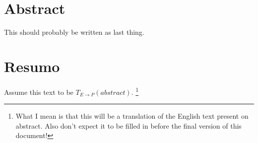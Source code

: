 \chapter*{Abstract}

This should probably be written as last thing.


\chapter*{Resumo}
Assume this text to be $T_{E \rightarrow P}(abstract)$.
\footnote{What I mean is that this will be a translation of the English text
present on abstract. Also don't expect it to be filled in before the final
version of this document!}

